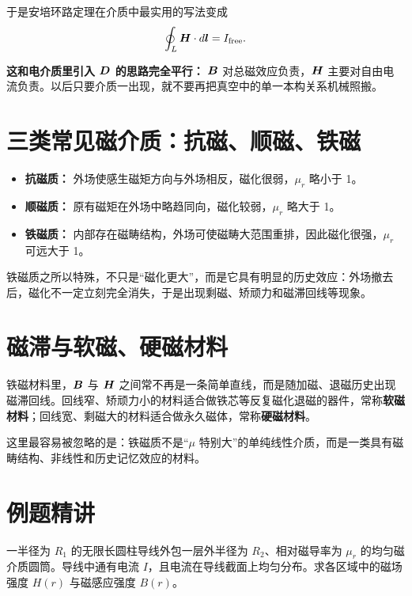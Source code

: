 \documentclass[lang=cn,11pt]{elegantbook}
\begin{document}
于是安培环路定理在介质中最实用的写法变成
\[
\oint_L \vb*{H}\cdot d\vb*{l}=I_{\mathrm{free}}.
\]

\begin{note}
\textbf{这和电介质里引入 \(\vb*{D}\) 的思路完全平行：} \(\vb*{B}\) 对总磁效应负责，\(\vb*{H}\) 主要对自由电流负责。以后只要介质一出现，就不要再把真空中的单一本构关系机械照搬。
\end{note}

\section{三类常见磁介质：抗磁、顺磁、铁磁}

\begin{itemize}
  \item \textbf{抗磁质：} 外场使感生磁矩方向与外场相反，磁化很弱，\(\mu_r\) 略小于 1。
  \item \textbf{顺磁质：} 原有磁矩在外场中略趋同向，磁化较弱，\(\mu_r\) 略大于 1。
  \item \textbf{铁磁质：} 内部存在磁畴结构，外场可使磁畴大范围重排，因此磁化很强，\(\mu_r\) 可远大于 1。
\end{itemize}

铁磁质之所以特殊，不只是“磁化更大”，而是它具有明显的历史效应：外场撤去后，磁化不一定立刻完全消失，于是出现剩磁、矫顽力和磁滞回线等现象。

\section{磁滞与软磁、硬磁材料}

铁磁材料里，\(\vb*{B}\) 与 \(\vb*{H}\) 之间常不再是一条简单直线，而是随加磁、退磁历史出现磁滞回线。回线窄、矫顽力小的材料适合做铁芯等反复磁化退磁的器件，常称\textbf{软磁材料}；回线宽、剩磁大的材料适合做永久磁体，常称\textbf{硬磁材料}。

\begin{remark}
这里最容易被忽略的是：铁磁质不是“\(\mu\) 特别大”的单纯线性介质，而是一类具有磁畴结构、非线性和历史记忆效应的材料。
\end{remark}

\section{例题精讲}

\begin{example}[\(H\) 与 \(B\) 的分段分工]
一半径为 \(R_1\) 的无限长圆柱导线外包一层外半径为 \(R_2\)、相对磁导率为 \(\mu_r\) 的均匀磁介质圆筒。导线中通有电流 \(I\)，且电流在导线截面上均匀分布。求各区域中的磁场强度 \(H(r)\) 与磁感应强度 \(B(r)\)。
\end{example}
\end{document}
